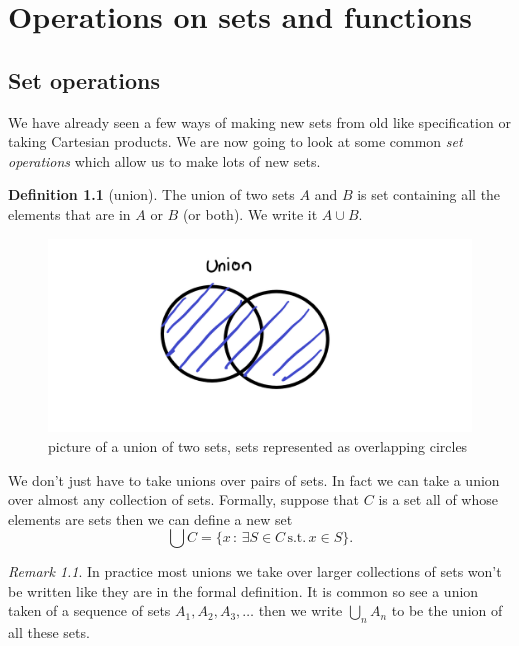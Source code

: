 \documentclass[
]{book}
\theoremstyle{definition}
\newtheorem{definition}{Definition}[chapter]
\theoremstyle{definition}
\theoremstyle{definition}
\theoremstyle{definition}
\theoremstyle{remark}
\newtheorem*{remark}{Remark}
\begin{document}
\chapter{Operations on sets and functions}\label{operations-on-sets-and-functions}

\section{Set operations}\label{set-operations}

We have already seen a few ways of making new sets from old like specification or taking Cartesian products. We are now going to look at some common \emph{set operations} which allow us to make lots of new sets.

\begin{definition}[union]
The union of two sets \(A\) and \(B\) is set containing all the elements that are in \(A\) or \(B\) (or both). We write it \(A\cup B\).

\begin{figure}
\centering
\includegraphics{union.png}
\caption{\label{fig:unnamed-chunk-9}picture of a union of two sets, sets represented as overlapping circles}
\end{figure}

We don't just have to take unions over pairs of sets. In fact we can take a union over almost any collection of sets. Formally, suppose that \(C\) is a set all of whose elements are sets then we can define a new set
\[ \bigcup C = \{ x \,:\, \exists S \in C\, \mbox{s.t.}\, x \in S\}.\]
\end{definition}

\begin{remark}
In practice most unions we take over larger collections of sets won't be written like they are in the formal definition. It is common so see a union taken of a sequence of sets \(A_1, A_2, A_3, \dots\) then we write \(\bigcup_n A_n\) to be the union of all these sets.
\end{remark}
\end{document}
